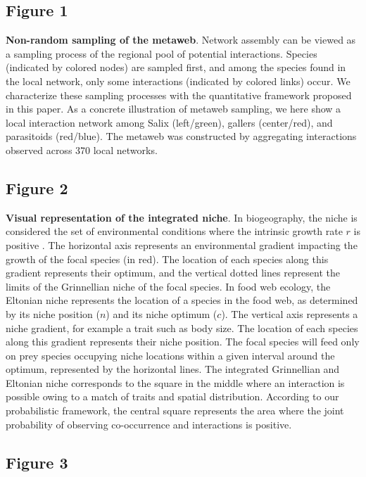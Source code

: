 \documentclass[12pt]{article}
\begin{document}
\subsection*{Figure 1}

\textbf{Non-random sampling of the metaweb}.  Network assembly can be viewed
as a sampling process of the regional pool of potential interactions. Species
(indicated by colored nodes) are sampled first, and among the species found in
the local network, only some interactions (indicated by colored links) occur.
We characterize these sampling processes with the quantitative framework
proposed in this paper. As a concrete illustration of metaweb sampling, we
here show a local interaction network among Salix (left/green), gallers
(center/red), and parasitoids (red/blue). The metaweb was constructed by
aggregating interactions observed across 370 local networks.

\subsection*{Figure 2}

\textbf{Visual representation of the integrated niche}. In biogeography, the
niche is considered the set of environmental conditions where the intrinsic
growth rate $r$ is positive \citep{Holt2009}. The horizontal axis represents
an environmental gradient impacting the growth of the focal species (in red).
The location of each species along this gradient represents their optimum, and
the vertical dotted lines represent the limits of the Grinnellian niche of the
focal species. In food web ecology, the Eltonian niche represents the location
of a species in the food web, as determined by its niche position ($n$) and
its niche optimum ($c$). The vertical axis represents a niche gradient,
for example a trait such as body size. The location of each species along this
gradient represents their niche position. The focal species will feed only on prey
species occupying niche locations within a given interval around the optimum,
represented by the horizontal lines. The integrated Grinnellian and Eltonian
niche corresponds to the square in the middle where an interaction is possible
owing to a match of traits and spatial distribution. According to our
probabilistic framework, the central square represents the area where the
joint probability of observing co-occurrence and interactions is positive.

\subsection*{Figure 3}
\end{document}
